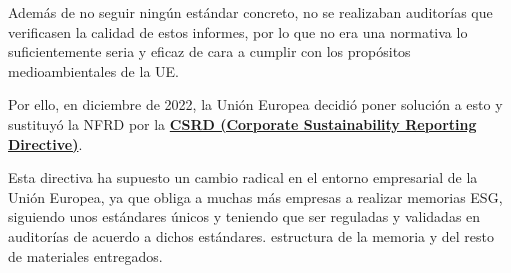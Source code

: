 Además de no seguir ningún estándar concreto, no se realizaban auditorías que verificasen la calidad de estos informes, por lo que no era una normativa lo suficientemente seria y eficaz de cara a cumplir con los propósitos medioambientales de la UE.

Por ello, en diciembre de 2022, la Unión Europea decidió poner solución a esto y sustituyó la NFRD por la \href{https://eur-lex.europa.eu/legal-content/EN/TXT/?uri=CELEX:32022L2464}{\textbf{CSRD (Corporate Sustainability Reporting Directive)}}. 

Esta directiva ha supuesto un cambio radical en el entorno empresarial de la Unión Europea, ya que obliga a muchas más empresas a realizar memorias ESG, siguiendo unos estándares únicos y teniendo que ser reguladas y validadas en auditorías de acuerdo a dichos estándares.
estructura de la memoria y del resto de materiales entregados.
